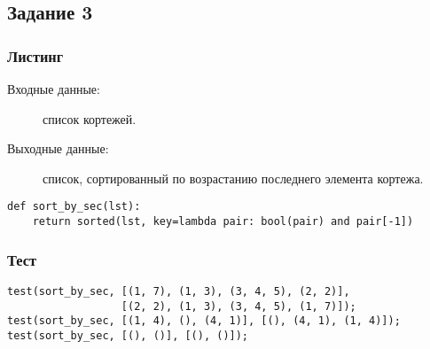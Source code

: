 \documentclass[12pt, a4paper] {ncc}
\begin{document}
    \subsection{Задание 3}
        \subsubsection{Листинг}
        \begin{description}
            \item[Входные данные:] список кортежей.
            \item[Выходные данные:] список, сортированный по возрастанию последнего элемента кортежа. 
        \end{description}
        \begin{lstlisting}
def sort_by_sec(lst):
    return sorted(lst, key=lambda pair: bool(pair) and pair[-1])
        \end{lstlisting}

        \subsubsection{Тест}

        \begin{lstlisting}
test(sort_by_sec, [(1, 7), (1, 3), (3, 4, 5), (2, 2)],
                  [(2, 2), (1, 3), (3, 4, 5), (1, 7)]);
test(sort_by_sec, [(1, 4), (), (4, 1)], [(), (4, 1), (1, 4)]);
test(sort_by_sec, [(), ()], [(), ()]);
        \end{lstlisting}
\end{document}
